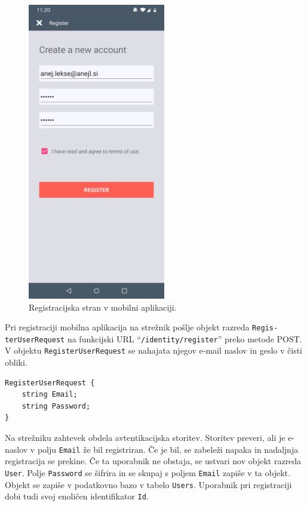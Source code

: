 \documentclass[a4paper, 12pt]{book}
\begin{document}
\begin{figure}[H]
\begin{center}
\includegraphics[width=6cm]{app_register}
\end{center}
	\caption{Registracijska stran v mobilni aplikaciji.}
\label{app_register}
\end{figure}

Pri registraciji mobilna aplikacija na strežnik pošlje objekt razreda \texttt{Regis-\\terUserRequest} na funkcijski URL \enquote{\texttt{/identity/register}} preko metode POST.
V objektu \texttt{RegisterUserRequest} se nahajata njegov e-mail naslov in geslo v čisti obliki.

\begin{verbatim}
RegisterUserRequest {
    string Email; 
    string Password; 
} 
\end{verbatim}


Na strežniku zahtevek obdela avtentikacijska storitev.
Storitev preveri, ali je e-naslov v polju \texttt{Email} že bil registriran.
Če je bil, se zabeleži napaka in nadaljnja registracija se prekine.
Če ta uporabnik ne obstaja, se ustvari nov objekt razreda \texttt{User}.
Polje \texttt{Password} se šifrira in se skupaj s poljem \texttt{Email} zapiše v ta objekt.
Objekt se zapiše v podatkovno bazo v tabelo \texttt{Users}.
Uporabnik pri registraciji dobi tudi svoj enoličen identifikator \texttt{Id}.
\end{document}
